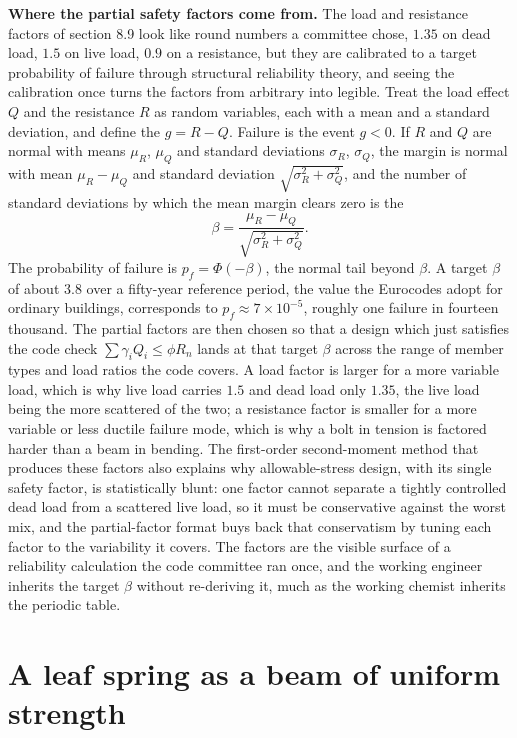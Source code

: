 \begin{mastery}
\textbf{Where the partial safety factors come from.} The load and
resistance factors of section 8.9 look like round numbers a committee
chose, $1.35$ on dead load, $1.5$ on live load, $0.9$ on a resistance,
but they are calibrated to a target probability of failure through
structural reliability theory, and seeing the calibration once turns the
factors from arbitrary into legible. Treat the load effect $Q$ and the
resistance $R$ as random variables, each with a mean and a standard
deviation, and define the  $g = R - Q$. Failure
is the event $g < 0$. If $R$ and $Q$ are normal with means $\mu_R$,
$\mu_Q$ and standard deviations $\sigma_R$, $\sigma_Q$, the margin is
normal with mean $\mu_R - \mu_Q$ and standard deviation
$\sqrt{\sigma_R^2 + \sigma_Q^2}$, and the number of standard deviations
by which the mean margin clears zero is the 
\[
\beta = \frac{\mu_R - \mu_Q}{\sqrt{\sigma_R^2 + \sigma_Q^2}}.
\]
The probability of failure is $p_f = \Phi(-\beta)$, the normal tail
beyond $\beta$. A target $\beta$ of about $3.8$ over a fifty-year
reference period, the value the Eurocodes adopt for ordinary buildings,
corresponds to $p_f \approx 7 \times 10^{-5}$, roughly one failure in
fourteen thousand. The partial factors are then chosen so that a design
which just satisfies the code check $\sum\gamma_i Q_i \le \phi R_n$ lands
at that target $\beta$ across the range of member types and load ratios
the code covers. A load factor is larger for a more variable load, which
is why live load carries $1.5$ and dead load only $1.35$, the live load
being the more scattered of the two; a resistance factor is smaller for
a more variable or less ductile failure mode, which is why a bolt in
tension is factored harder than a beam in bending. The first-order
second-moment method that produces these factors also explains why
allowable-stress design, with its single safety factor, is
statistically blunt: one factor cannot separate a tightly controlled
dead load from a scattered live load, so it must be conservative against
the worst mix, and the partial-factor format buys back that
conservatism by tuning each factor to the variability it covers. The
factors are the visible surface of a reliability calculation the code
committee ran once, and the working engineer inherits the target
$\beta$ without re-deriving it, much as the working chemist inherits the
periodic table.
\end{mastery}

\section{A leaf spring as a beam of uniform strength}

